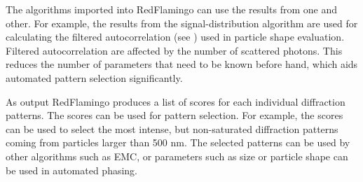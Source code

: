 The algorithms imported into RedFlamingo can use the results from one and other. For example, the results from the signal-distribution algorithm are used for calculating the filtered autocorrelation (see \cite{Seibert2011}) used in particle shape evaluation. Filtered autocorrelation are  affected by the number of scattered photons. This reduces the number of parameters that need to be known before hand, which aids automated pattern selection significantly.

As output RedFlamingo produces a list of scores for each individual diffraction patterns. The scores can be used for pattern selection. For example, the scores can be used to select the most intense, but non-saturated diffraction patterns coming from particles larger than 500 nm. The selected patterns can be used by other algorithms such as EMC, or parameters such as size or particle shape can be used in automated phasing. 





